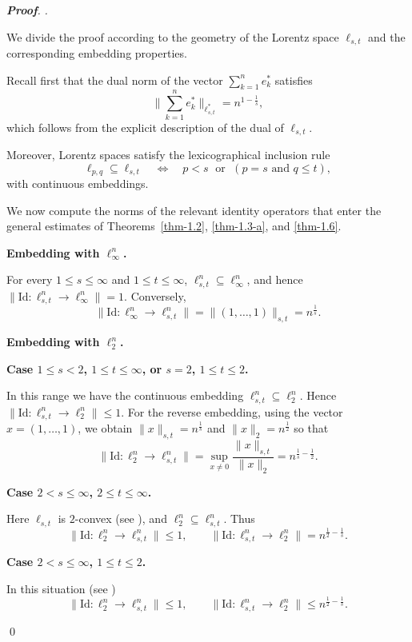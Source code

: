 \documentclass[a4paper,11pt, reqno]{amsart}
\theoremstyle{definition}
\newenvironment{pf}[1][]{%
	\vskip 3mm
	\noindent
	\ifthenelse{\equal{#1}{}}%
	{{\slshape {\bf Proof}. }}%
	{{\slshape #1.} }%
}%
{\qed\bigskip}
\begin{document}
\begin{pf}
	We divide the proof according to the geometry of the Lorentz space 
	$\ell_{s,t}$ and the corresponding embedding properties.
	
	\medskip
	\noindent
	Recall first that the dual norm of the vector $\sum_{k=1}^{n} e_k^*$ satisfies
	\[
	\Big\|\sum_{k=1}^{n} e_k^*\Big\|_{\ell_{s,t}^*}
	= n^{1-\frac{1}{s}},
	\]
	which follows from the explicit description of the dual of 
	$\ell_{s,t}$.
	
	Moreover, Lorentz spaces satisfy the lexicographical inclusion rule
	\[
	\ell_{p,q}\subseteq \ell_{s,t}
	\quad\Longleftrightarrow\quad
	p<s \;\text{ or }\; (p=s \text{ and } q\le t),
	\]
	with continuous embeddings.
	
	We now compute the norms of the relevant identity operators
	that enter the
	general estimates of Theorems~\ref{thm-1.2}, \ref{thm-1.3-a},
	and \ref{thm-1.6}.
	
	\medskip
	\noindent
	\textbf{Embedding with $\ell_\infty^n$.}
	
	For every $1\le s\le\infty$ and $1\le t\le\infty$,
	$
	\ell_{s,t}^n \subseteq \ell_\infty^n
	$,
	and hence
	$
	\|\mathrm{Id}: \ell_{s,t}^n \to \ell_\infty^n\| = 1
	$.
	Conversely,
	\[
	\|\mathrm{Id}: \ell_\infty^n \to \ell_{s,t}^n\|
	= \|(1,\dots,1)\|_{s,t}
	= n^{\frac1s}.
	\]
	
	\medskip
	\noindent
	\textbf{Embedding with $\ell_2^n$.}
	
	\medskip
	\textbf{Case $1 \le s < 2$, $1\le t\le\infty$, or $s=2$, $1\le t\le2$.}
	
	In this range we have the continuous embedding
	$\ell_{s,t}^n \subseteq \ell_2^n$.
	Hence
	$\|\mathrm{Id}: \ell_{s,t}^n \to \ell_2^n\| \le 1$.
	For the reverse embedding, using the vector $x=(1,\dots,1)$, we obtain $\|x\|_{s,t}=n^{\frac1s}$ and $\|x\|_2=n^{\frac12}$
	so that
	\[
	\|\mathrm{Id}: \ell_2^n \to \ell_{s,t}^n\|
	=\sup_{x\neq0}\frac{\|x\|_{s,t}}{\|x\|_2}
	= n^{\frac1s-\frac12}.
	\]
	
	\medskip
	\textbf{Case $2<s\le\infty$, $2\le t\le\infty$.}
	
	Here $\ell_{s,t}$ is $2$-convex (see \cite[p.~189]{defant-2003}),
	and $\ell_2^n \subseteq \ell_{s,t}^n$.
	Thus
	\[
	\|\mathrm{Id}: \ell_2^n \to \ell_{s,t}^n\| \le 1,
	\qquad
	\|\mathrm{Id}: \ell_{s,t}^n \to \ell_2^n\|
	= n^{\frac12-\frac1s}.
	\]
	
	\medskip
	\textbf{Case $2<s\le\infty$, $1\le t\le2$.}
	
	In this situation (see \cite[p.~189]{defant-2003})
	\[
	\|\mathrm{Id}: \ell_2^n \to \ell_{s,t}^n\| \le 1,
	\qquad
	\|\mathrm{Id}: \ell_{s,t}^n \to \ell_2^n\|
	\le n^{\frac12-\frac1s}.
	\]
	

\end{pf}
\end{document}

